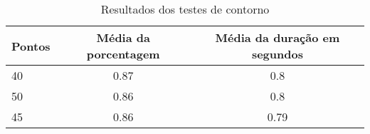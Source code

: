 \begin{table}[h]
    \centering
    \caption{Resultados dos testes de contorno}
    \label{tab:resultados-contorno}
    \begin{tabular}{|l|c|c|}
        \hline
        {Pontos} & {Média da porcentagem} & {Média da duração em segundos} \\
        \hline
        40 & 0.87 & 0.8\\
        50 & 0.86 & 0.8\\
        45 & 0.86 & 0.79\\
        \hline
    \end{tabular}
\end{table}